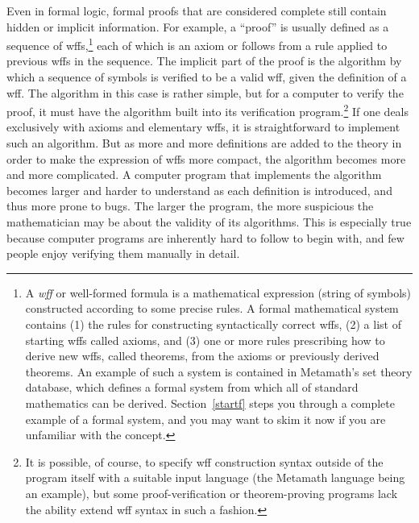 Even in formal logic, formal proofs
that are considered complete still contain hidden or implicit information.
For example, a ``proof'' is usually defined as a sequence of
wffs,\footnote{A {\em wff} or well-formed
formula is a mathematical expression (string of symbols) constructed according
to some precise rules.  A formal mathematical system
contains (1) the rules for constructing syntactically correct
wffs, (2) a list of starting wffs called
axioms, and (3) one or more rules prescribing how to derive new
wffs, called theorems, from the axioms or previously derived
theorems.  An example of such a system is contained in
Metamath's set theory database, which defines a formal
system from which all of standard mathematics can be
derived.  Section~\ref{startf} steps you through a complete example of a formal
system, and you may want to skim it now if you are unfamiliar with the
concept.} each of which is an axiom or follows from a rule applied to previous
wffs in the sequence.  The implicit part of the proof is the algorithm by
which a sequence of symbols is verified to be a valid wff, given the
definition of a wff.  The algorithm in this case is rather simple, but for a
computer to verify the proof, it must have
the algorithm built into its verification program.\footnote{It is possible, of
course, to specify wff construction syntax outside of the program itself
with a suitable input language (the Metamath language being an example), but
some proof-verification or theorem-proving programs lack the ability extend
wff syntax in such a fashion.} If one deals exclusively with axioms and
elementary wffs, it is straightforward to implement such an algorithm.  But as
more and more definitions are added to the theory in order to make the
expression of wffs more compact, the algorithm becomes more and more
complicated.  A computer program that implements the algorithm becomes larger
and harder to understand as each definition is introduced, and thus more prone
to bugs.  The larger the program, the
more suspicious the mathematician may be about
the validity of its algorithms.  This is especially true because
computer programs are inherently hard to follow to begin with, and few people
enjoy verifying them manually in detail.

